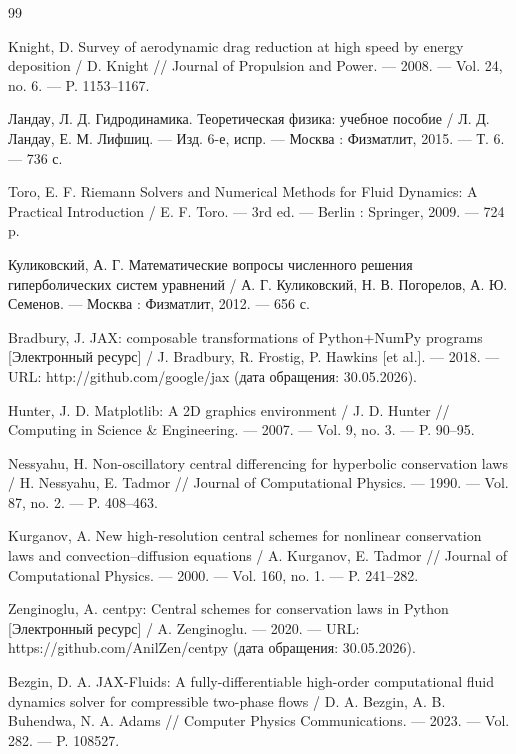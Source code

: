 \documentclass[a4paper,14pt]{extarticle}
\theoremstyle{theorem}
\theoremstyle{lemma}
\begin{document}
\newpage
\begin{thebibliography}{99}


Knight, D. Survey of aerodynamic drag reduction at high speed by energy deposition / D. Knight // Journal of Propulsion and Power. --- 2008. --- Vol. 24, no. 6. --- P. 1153--1167.

Ландау, Л. Д. Гидродинамика. Теоретическая физика: учебное пособие / Л. Д. Ландау, Е. М. Лифшиц. --- Изд. 6-е, испр. --- Москва : Физматлит, 2015. --- Т. 6. --- 736 с.

Toro, E. F. Riemann Solvers and Numerical Methods for Fluid Dynamics: A Practical Introduction / E. F. Toro. --- 3rd ed. --- Berlin : Springer, 2009. --- 724 p.

Куликовский, А. Г. Математические вопросы численного решения гиперболических систем уравнений / А. Г. Куликовский, Н. В. Погорелов, А. Ю. Семенов. --- Москва : Физматлит, 2012. --- 656 с.

Bradbury, J. JAX: composable transformations of Python+NumPy programs [Электронный ресурс] / J. Bradbury, R. Frostig, P. Hawkins [et al.]. --- 2018. --- URL: http://github.com/google/jax (дата обращения: 30.05.2026).

Hunter, J. D. Matplotlib: A 2D graphics environment / J. D. Hunter // Computing in Science \& Engineering. --- 2007. --- Vol. 9, no. 3. --- P. 90--95.

Nessyahu, H. Non-oscillatory central differencing for hyperbolic conservation laws / H. Nessyahu, E. Tadmor // Journal of Computational Physics. --- 1990. --- Vol. 87, no. 2. --- P. 408--463.

Kurganov, A. New high-resolution central schemes for nonlinear conservation laws and convection--diffusion equations / A. Kurganov, E. Tadmor // Journal of Computational Physics. --- 2000. --- Vol. 160, no. 1. --- P. 241--282.

Zenginoglu, A. centpy: Central schemes for conservation laws in Python [Электронный ресурс] / A. Zenginoglu. --- 2020. --- URL: https://github.com/AnilZen/centpy (дата обращения: 30.05.2026).

Bezgin, D. A. JAX-Fluids: A fully-differentiable high-order computational fluid dynamics solver for compressible two-phase flows / D. A. Bezgin, A. B. Buhendwa, N. A. Adams // Computer Physics Communications. --- 2023. --- Vol. 282. --- P. 108527.


\end{thebibliography}
\end{document}

